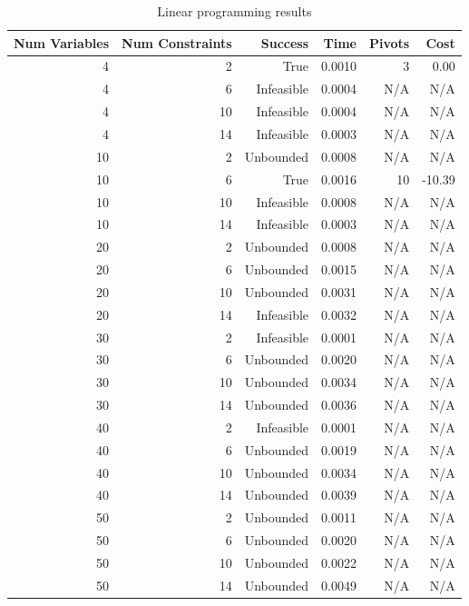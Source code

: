 \begin{table}[ht]
    \centering
    \begin{tabular}{rrrrrr}
        \toprule
        Num Variables & Num Constraints & Success & Time & Pivots & Cost \\
        \midrule
        4 & 2 & True & 0.0010 & 3 & 0.00 \\
		4 & 6 & Infeasible & 0.0004 & N/A & N/A \\
		4 & 10 & Infeasible & 0.0004 & N/A & N/A \\
		4 & 14 & Infeasible & 0.0003 & N/A & N/A \\
		10 & 2 & Unbounded & 0.0008 & N/A & N/A \\
		10 & 6 & True & 0.0016 & 10 & -10.39 \\
		10 & 10 & Infeasible & 0.0008 & N/A & N/A \\
		10 & 14 & Infeasible & 0.0003 & N/A & N/A \\
		20 & 2 & Unbounded & 0.0008 & N/A & N/A \\
		20 & 6 & Unbounded & 0.0015 & N/A & N/A \\
		20 & 10 & Unbounded & 0.0031 & N/A & N/A \\
		20 & 14 & Infeasible & 0.0032 & N/A & N/A \\
		30 & 2 & Infeasible & 0.0001 & N/A & N/A \\
		30 & 6 & Unbounded & 0.0020 & N/A & N/A \\
		30 & 10 & Unbounded & 0.0034 & N/A & N/A \\
		30 & 14 & Unbounded & 0.0036 & N/A & N/A \\
		40 & 2 & Infeasible & 0.0001 & N/A & N/A \\
		40 & 6 & Unbounded & 0.0019 & N/A & N/A \\
		40 & 10 & Unbounded & 0.0034 & N/A & N/A \\
		40 & 14 & Unbounded & 0.0039 & N/A & N/A \\
		50 & 2 & Unbounded & 0.0011 & N/A & N/A \\
		50 & 6 & Unbounded & 0.0020 & N/A & N/A \\
		50 & 10 & Unbounded & 0.0022 & N/A & N/A \\
		50 & 14 & Unbounded & 0.0049 & N/A & N/A \\
        \bottomrule
    \end{tabular}
    \caption{Linear programming results}
    \label{tab:lp-results}
\end{table}
